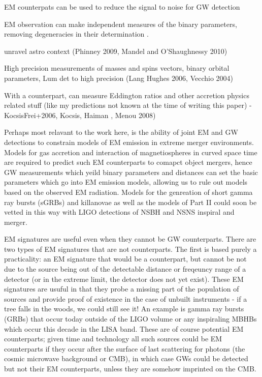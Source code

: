 EM counterpats can be used to reduce the signal to noise for GW detection \citep{KochanekPiran:1993, HarryFairhurst 2011}

EM observation can make independent measures of the binary parameters,
removing degeneracies in their determination \citep{HughesHolz:2003}.




unravel astro context (Phinney 2009, Mandel and O'Shaughnessy 2010)


High precision measurements of masses and spins vectors, binary orbital
parameters, Lum det to high precision (Lang Hughes 2006, Vecchio 2004)

With a counterpart, can measure Eddington ratios and other accretion physics
related stuff (like my predictions not known at the time of writing this
paper) - KocsisFrei+2006, Kocsis, Haiman , Menou 2008)

Perhaps most relavant to the work here, is the ability of joint EM and GW detections to constrain models of EM emission in extreme merger environments. Models for gas accretion and interaction of magnetiospheres in curved space time are required to predict such EM counterparts to comapct object mergers, hence GW measurements which yeild binary parameters and distances can set the basic parameters which go into EM emission models, allowing us to rule out models based on the observed EM radiation. Models for the genreation of short gamma ray bursts (sGRBs) and killanovae \citep{phinney2009mentionsthis} as well as the models of Part II could soon be vetted in this way with LIGO detections of NSBH and NSNS inspiral and merger.




EM signatures are useful even when they cannot be GW counterparts. There are
two types of EM signatures that are not counterparts. The first is based
purely a practicality: an EM signature that would be a counterpart, but cannot
be not due to the source being out of the detectable distance or freqeuncy
range of a detector (or in the extreme limit, the detector does not yet
exist). These EM signatures are usuful in that they probe a missing part of
the population of sources and provide proof of existence in the case of
unbuilt instruments - if a tree falls in the woods, we could still see it! An
example is gamma ray bursts (GRBs) that occur today outside of the LIGO volume
or any inspiraling MBHBs which occur this decade in the LISA band. These are
of course potential EM counterparts; given time and technology all such
sources could be EM counterparts if they occur after the surface of last
scattering for photons (the cosmic microwave background or CMB), in which case
GWs could be detected but not their EM counterparts, unless they are somehow
imprinted on the CMB.


